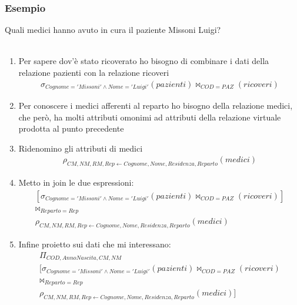 \subsubsection{Esempio}
Quali medici hanno avuto in cura il paziente Missoni Luigi?\\\\
    \begin{enumerate}
        \item{Per sapere dov'è stato ricoverato ho bisogno di combinare i dati della relazione pazienti con la relazione ricoveri
            \begin{equation}\begin{aligned}
                \sigma_{Cognome = 'Missoni' \wedge Nome = 'Luigi'} (pazienti) \bowtie_{COD = PAZ} (ricoveri)
            \end{aligned}\end{equation}}
        \item{Per conoscere i medici afferenti al reparto ho bisogno della relazione medici, che però, ha molti attributi omonimi ad attributi della relazione virtuale prodotta al punto precedente}
        \item{Ridenomino gli attributi di medici
            \begin{equation}\begin{aligned}
                \rho_{CM, NM, RM, Rep \leftarrow
                Cognome, Nome, Residenza, Reparto} (medici) 
            \end{aligned}\end{equation}}
        \item{Metto in join le due espressioni:
            \begin{equation}\begin{aligned}
                [\sigma_{Cognome = 'Missoni' \wedge Nome = 'Luigi'} (pazienti) \bowtie_{COD = PAZ} (ricoveri)]\\
                \bowtie_{Reparto = Rep}\\
                \rho_{CM, NM, RM, Rep \leftarrow
                Cognome, Nome, Residenza, Reparto} (medici) 
            \end{aligned}\end{equation}}
        \item{Infine proietto sui dati che mi interessano:
            \begin{equation}\begin{aligned}
                \Pi_{COD, AnnoNascita, CM, NM}\\
                [\sigma_{Cognome = 'Missoni' \wedge Nome = 'Luigi'} (pazienti) \bowtie_{COD = PAZ} (ricoveri)\\
                \bowtie_{Reparto = Rep}\\
                \rho_{CM, NM, RM, Rep \leftarrow
                Cognome, Nome, Residenza, Reparto} (medici)]
            \end{aligned}\end{equation}}
    \end{enumerate}
    
